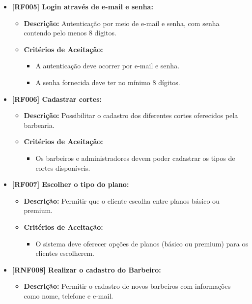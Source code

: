 \documentclass[12pt]{article}
\begin{document}
\begin{itemize}
\begin{itemize}
\begin{itemize}
        \end{itemize}
    \end{itemize}
    \item \textbf{[RF005] Login através de e-mail e senha:}
    \begin{itemize}
        \item \textbf{Descrição:} Autenticação por meio de e-mail e senha, com senha contendo pelo menos 8 dígitos.
        \item \textbf{Critérios de Aceitação:}
        \begin{itemize}
            \item A autenticação deve ocorrer por e-mail e senha.
            \item A senha fornecida deve ter no mínimo 8 dígitos.
        \end{itemize}
    \end{itemize}
    \item \textbf{[RF006] Cadastrar cortes:}
    \begin{itemize}
        \item \textbf{Descrição:} Possibilitar o cadastro dos diferentes cortes oferecidos pela barbearia.
        \item \textbf{Critérios de Aceitação:}
        \begin{itemize}
            \item Os barbeiros e administradores devem poder cadastrar os tipos de cortes disponíveis.
        \end{itemize}
    \end{itemize}
    \item \textbf{[RF007] Escolher o tipo do plano:}
    \begin{itemize}
        \item \textbf{Descrição:} Permitir que o cliente escolha entre planos básico ou premium.
        \item \textbf{Critérios de Aceitação:}
        \begin{itemize}
            \item O sistema deve oferecer opções de planos (básico ou premium) para os clientes escolherem.
        \end{itemize}
    \end{itemize}
    \item \textbf{[RNF008] Realizar o cadastro do Barbeiro:}
    \begin{itemize}
        \item \textbf{Descrição:} Permitir o cadastro de novos barbeiros com informações como nome, telefone e e-mail.

\end{itemize}
\end{itemize}
\end{document}
